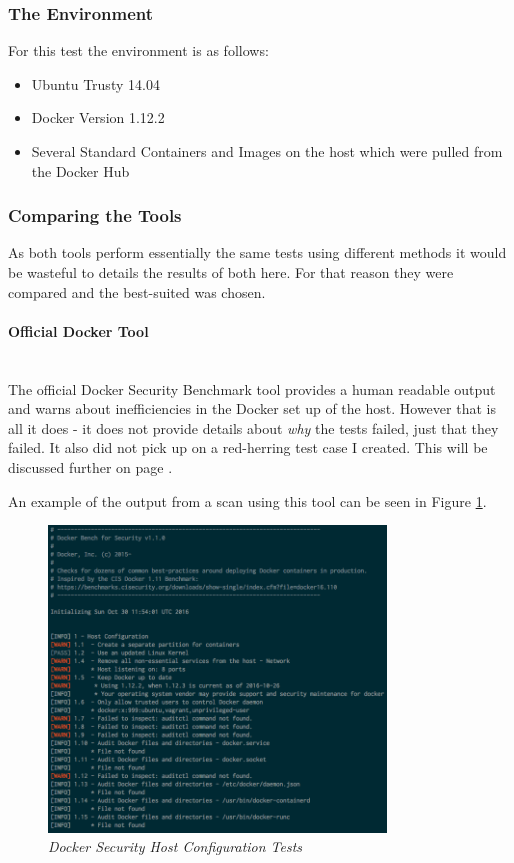 \documentclass{article}
\begin{document}
\subsubsection{The Environment}
For this test the environment is as follows:

\begin{itemize}
  \item Ubuntu Trusty 14.04
  \item Docker Version 1.12.2
  \item Several Standard Containers and Images on the host which were pulled from the Docker Hub
\end{itemize}

\subsubsection{Comparing the Tools}
As both tools perform essentially the same tests using different methods it would be wasteful to details the results of both here. For that reason they were compared and the best-suited was chosen.

\paragraph{Official Docker Tool}\mbox{}\\
The official Docker Security Benchmark tool provides a human readable output and warns about inefficiencies in the Docker set up of the host. However that is all it does - it does not provide details about \textit{why} the tests failed, just that they failed. It also did not pick up on a red-herring test case I created. This will be discussed further on page \pageref{par:untrusted}.

An example of the output from a scan using this tool can be seen in Figure \ref{fig:host_config}.

\begin{figure}[!h]
\centering
\includegraphics*[width=0.8\textwidth]{components/images/docker-benchmark-host-configuration}
\caption{\em Docker Security Host Configuration Tests}
\label{fig:host_config}
\end{figure}
\end{document}
